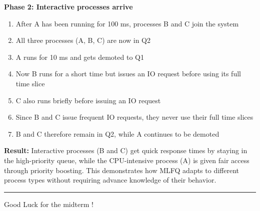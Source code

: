 \documentclass[../../compsys.tex]{subfiles}
\begin{document}
\begin{example}
\textbf{Phase 2: Interactive processes arrive}
\begin{enumerate}
    \item After A has been running for 100 ms, processes B and C join the system
    \item All three processes (A, B, C) are now in Q2
    \item A runs for 10 ms and gets demoted to Q1
    \item Now B runs for a short time but issues an IO request before using its full time slice
    \item C also runs briefly before issuing an IO request
    \item Since B and C issue frequent IO requests, they never use their full time slices
    \item B and C therefore remain in Q2, while A continues to be demoted
\end{enumerate}

\textbf{Result:} Interactive processes (B and C) get quick response times by staying in the high-priority queue, while the CPU-intensive process (A) is given fair access through priority boosting. This demonstrates how MLFQ adapts to different process types without requiring advance knowledge of their behavior.
\end{example}
\hrule
\vspace{10px}
Good Luck for the midterm ! 
\end{document}
